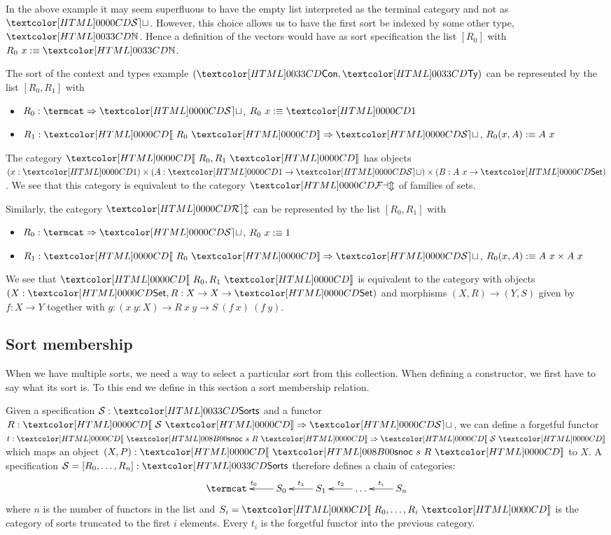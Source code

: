 In the above example it may seem superfluous to have the empty list
interpreted as the terminal category and not as $\SET$. However, this
choice allows us to have the first sort be indexed by some other type,
\eg $\natty$. Hence a definition of the vectors would have as sort
specification the list $[R_0]$ with $R_0\ x \ddefeq \natty$.

\begin{example}
  The sort of the context and types example $(\ttconty, \tttyty)$ can be
  represented by the list $[R_0, R_1]$ with
  \begin{itemize}
  \item $R_0 : \Func{\termcat}{\SET}$, $R_0\ x \ddefeq \unitty$
  \item $R_1 : \Func{\SortCat{R_0}}{\SET}$, $R_0 (x, A) :\equiv A\ x$
  \end{itemize}
  The category $\SortCat{R_0,R_1}$ has objects
  $(x : \unitty) \times (A : \unitty \to \SET) \times (B : A\ x \to
  \Set)$.
  We see that this category is equivalent to the category $\FAM$ of
  families of sets.
\end{example}

\begin{example}
  \label{rel-sorts}
  Similarly, the category $\REL$ can be represented by the list
  $[R_0, R_1]$ with
  \begin{itemize}
  \item $R_0 : \Func{\termcat}{\SET}$, $R_0\ x :\equiv 1$
  \item $R_1 : \Func{\SortCat{R_0}}{\SET}$, $R_0 (x, A) :\equiv A\ x \times A\ x$
  \end{itemize}
  We see that $\SortCat{R_0,R_1}$ is equivalent to the category with
  objects $(X : \Set, R : X \to X \to \Set)$ and morphisms
  $(X,R) \to (Y,S)$ given by $f : X \to Y$ together with
  $g : (x\ y: X) \to R\ x\ y \to S\ (f\ x)\ (f\ y)$.
\end{example}

\subsection{Sort membership}

When we have multiple sorts, we need a way to select a particular sort
from this collection. When defining a constructor, we first have to
say what its sort is. To this end we define in this section a sort
membership relation.

Given a specification $\Ss : \sortsty$ and a functor
$R : \Func{\SortCat{\Ss}}{\SET}$, we can define a forgetful functor
$t : \Func{\SortCat{\sortssnoc\ s\ R}}{\SortCat{\Ss}}$ which maps an object
$(X , P) : \SortCat{\sortssnoc\ s\ R}$ to $X$. A specification
$\Ss = [R_0, \ldots, R_n] : \sortsty$ therefore defines a chain of
categories:
$$
\xymatrix{
\termcat &S_0 \ar[l]_{t_0} &S_1 \ar[l]_{t_1} &\hdots \ar[l]_{t_2} &S_n \ar[l]_{t_i}
}
$$
where $n$ is the number of functors in the list and
$S_i = \SortCat{R_0, \ldots, R_i}$ is the category of sorts truncated
to the first $i$ elements. Every $t_i$ is the forgetful functor into
the previous category.

